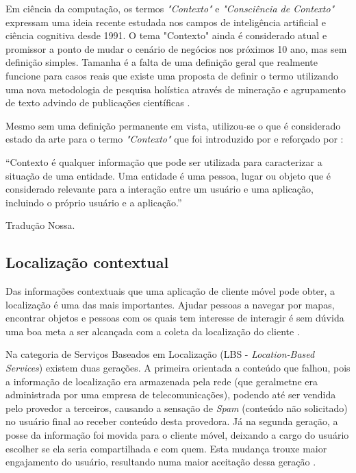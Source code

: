Em ciência da computação, os termos \emph{"Contexto"} e \emph{"Consciência
de Contexto"} expressam uma ideia recente estudada nos campos de inteligência
artificial e ciência cognitiva desde 1991. O tema "Contexto" ainda é considerado
atual e promissor a ponto de mudar o cenário de negócios nos próximos 10 ano, mas
sem definição simples. Tamanha é a falta de uma definição geral que
realmente funcione para casos reais que existe uma proposta de definir o termo
utilizando uma nova metodologia de pesquisa holística através de mineração e
agrupamento de texto advindo de publicações científicas \cite{Pascalau2013}.

Mesmo sem uma definição permanente em vista, utilizou-se o que é considerado
estado da arte para o termo \emph{"Contexto"} que foi introduzido por
 e reforçado por :

\begin{citacao}

	``Contexto é qualquer informação que pode ser utilizada para caracterizar a
	situação de uma entidade. Uma entidade é uma pessoa, lugar ou objeto que é
	considerado relevante para a interação entre um usuário e uma aplicação,
	incluindo o próprio usuário e a aplicação.'' \

	 Tradução Nossa.
\end{citacao}

\subsection{Localização contextual}
\label{subsec:Localização contextual}

Das informações contextuais que uma aplicação de cliente móvel pode obter, a
localização é uma das mais importantes. Ajudar pessoas a navegar por mapas,
encontrar objetos e pessoas com os quais tem interesse de interagir é sem dúvida
uma boa meta a ser alcançada com a coleta da localização do cliente
\cite{Bellavista2008}.

Na categoria de Serviços Baseados em Localização (LBS - \emph{Location-Based
Services}) existem duas gerações. A primeira orientada a conteúdo que falhou,
pois a informação de localização era armazenada pela rede (que geralmetne era
administrada por uma empresa de telecomunicações), podendo até ser vendida pelo
provedor a terceiros, causando a sensação de \emph{Spam} (conteúdo não
solicitado) no usuário final ao receber conteúdo desta provedora. Já na segunda
geração, a posse da informação foi movida para o cliente móvel, deixando a cargo
do usuário escolher se ela seria compartilhada e com quem. Esta mudança trouxe
maior engajamento do usuário, resultando numa maior aceitação dessa geração
\cite{Bellavista2008}.


